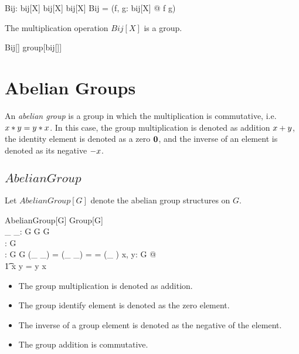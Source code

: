 \documentclass[11pt, oneside]{article}
\begin{document}
\begin{gendef}[X]
	Bij: bij[X] \cross bij[X] \fun bij[X]
\where
	Bij = (\lambda f, g: bij[X] @ f \circ g)
\end{gendef}

\begin{theorem}
The multiplication operation $Bij[X]$ is a group.

\begin{zed}
	Bij[\setX] \in group[bij[\setX]]
\end{zed}

\end{theorem}

\section{Abelian Groups}

An {\it abelian group} is a group in which the multiplication is commutative, i.e. $x \mathbin{*} y = y \mathbin{*} x$.
In this case, the group multiplication is denoted as addition $x \mathbin{+} y$, the identity element is denoted as a zero $\mathbf{0}$,
and the inverse of an element is denoted as its negative $- x$.

\subsection{$AbelianGroup$}

Let $AbelianGroup[G]$ denote the abelian group structures on $G$.

\begin{schema}{AbelianGroup}[G]
	Group[G] \\
	\_ \gadd \_: G \cross G \fun G \\
	\gzero: G \\
	\gneg: G \fun G
\where
	(\_ \gadd \_) = (\_ \gmul \_)
\also
	\gzero = \gone
\also
	\gneg = (\_ \ginv)
\also
	\forall x, y: G @ \\
	\t1	x \gadd y = y \gadd x
\end{schema}
\begin{itemize}

\item The group multiplication is denoted as addition.

\item The group identify element is denoted as the zero element.

\item The inverse of a group element is denoted as the negative of the element.

\item The group addition is commutative.

\end{itemize}
\end{document}
